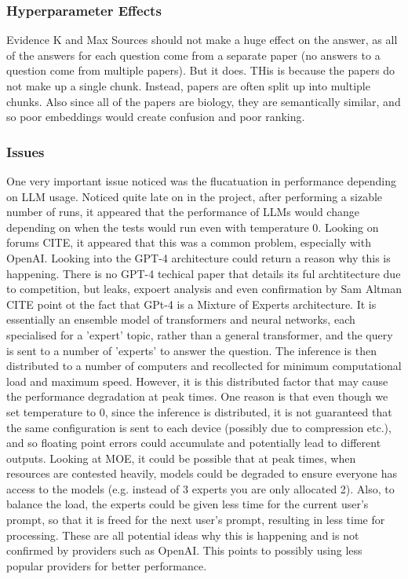 \subsubsection{Hyperparameter Effects}
Evidence K and Max Sources should not make a huge effect on the answer, as all of the answers for each question come from a separate paper (no answers to a question come from multiple papers). But it does. THis is because the papers do not make up a single chunk. Instead, papers are often split up into multiple chunks. Also since all of the papers are biology, they are semantically similar, and so poor embeddings would create confusion and poor ranking. 

\subsubsection{Issues}
One very important issue noticed was the flucatuation in performance depending on LLM usage.
Noticed quite late on in the project, after performing a sizable number of runs, it appeared that the performance of LLMs would change depending on when the tests would run even with temperature 0. Looking on forums CITE, it appeared that this was a common problem, especially with OpenAI. Looking into the GPT-4 architecture could return a reason why this is happening. There is no GPT-4 techical paper that details its ful archtitecture due to competition, but leaks, expoert analysis and even confirmation by Sam Altman CITE point ot the fact that GPt-4 is a Mixture of Experts architecture. It is essentially an ensemble model of transformers and neural networks, each specialised for a 'expert' topic, rather than a general transformer, and the query is sent to a number of 'experts' to answer the question. The inference is then distributed to a number of computers and recollected for minimum computational load and maximum speed. However, it is this distributed factor that may cause the performance degradation at peak times. One reason is that even though we set temperature to 0, since the inference is distributed, it is not guaranteed that the same configuration is sent to each device (possibly due to compression etc.), and so floating point errors could accumulate and potentially lead to different outputs. Looking at MOE, it could be possible that at peak times, when resources are contested heavily, models could be degraded to ensure everyone has access to the models (e.g. instead of 3 experts you are only allocated 2). Also, to balance the load, the experts could be given less time for the current user's prompt, so that it is freed for the next user's prompt, resulting in less time for processing. These are all potential ideas why this is happening and is not confirmed by providers such as OpenAI. This points to possibly using less popular providers for better performance. 
